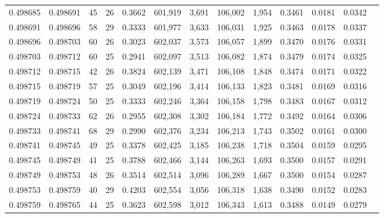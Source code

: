 \begin{tabular}{rrrrrrrrrrrrr}
0.498685 & 0.498691 &  45 &  26 &                                     0.3662 & 601,919 &   3,691 & 106,002 &   1,954 & 0.3461 & 0.0181 & 0.0342 \\
0.498691 & 0.498696 &  58 &  29 &                                     0.3333 & 601,977 &   3,633 & 106,031 &   1,925 & 0.3463 & 0.0178 & 0.0337 \\
0.498696 & 0.498703 &  60 &  26 &                                     0.3023 & 602,037 &   3,573 & 106,057 &   1,899 & 0.3470 & 0.0176 & 0.0331 \\
0.498703 & 0.498712 &  60 &  25 &                                     0.2941 & 602,097 &   3,513 & 106,082 &   1,874 & 0.3479 & 0.0174 & 0.0325 \\
0.498712 & 0.498715 &  42 &  26 &                                     0.3824 & 602,139 &   3,471 & 106,108 &   1,848 & 0.3474 & 0.0171 & 0.0322 \\
0.498715 & 0.498719 &  57 &  25 &                                     0.3049 & 602,196 &   3,414 & 106,133 &   1,823 & 0.3481 & 0.0169 & 0.0316 \\
0.498719 & 0.498724 &  50 &  25 &                                     0.3333 & 602,246 &   3,364 & 106,158 &   1,798 & 0.3483 & 0.0167 & 0.0312 \\
0.498724 & 0.498733 &  62 &  26 &                                     0.2955 & 602,308 &   3,302 & 106,184 &   1,772 & 0.3492 & 0.0164 & 0.0306 \\
0.498733 & 0.498741 &  68 &  29 &                                     0.2990 & 602,376 &   3,234 & 106,213 &   1,743 & 0.3502 & 0.0161 & 0.0300 \\
0.498741 & 0.498745 &  49 &  25 &                                     0.3378 & 602,425 &   3,185 & 106,238 &   1,718 & 0.3504 & 0.0159 & 0.0295 \\
0.498745 & 0.498749 &  41 &  25 &                                     0.3788 & 602,466 &   3,144 & 106,263 &   1,693 & 0.3500 & 0.0157 & 0.0291 \\
0.498749 & 0.498753 &  48 &  26 &                                     0.3514 & 602,514 &   3,096 & 106,289 &   1,667 & 0.3500 & 0.0154 & 0.0287 \\
0.498753 & 0.498759 &  40 &  29 &                                     0.4203 & 602,554 &   3,056 & 106,318 &   1,638 & 0.3490 & 0.0152 & 0.0283 \\
0.498759 & 0.498765 &  44 &  25 &                                     0.3623 & 602,598 &   3,012 & 106,343 &   1,613 & 0.3488 & 0.0149 & 0.0279 \\

\end{tabular}
